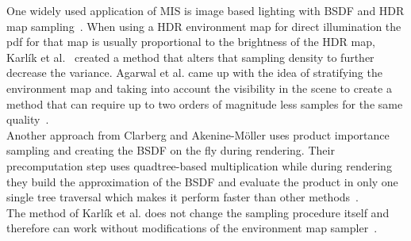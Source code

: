 One widely used application of MIS is image based lighting with BSDF and HDR map sampling~\cite{pbr-book}.
When using a HDR environment map for direct illumination the pdf for that map is usually proportional to the brightness of the HDR map,
Karl\'ik et al.~\cite{Karlik2019} created a method that alters that sampling density to further decrease the variance.
Agarwal et al. came up with the idea of stratifying the environment map
and taking into account the visibility in the scene
to create a method that can require up to two orders of magnitude less samples for the same quality~\cite{agarwal}.\\
Another approach from Clarberg and Akenine-Möller uses product importance sampling
and creating the BSDF on the fly during rendering.
Their precomputation step uses quadtree-based multiplication while during rendering they build the approximation of the BSDF
and evaluate the product in only one single tree traversal which makes it perform faster than other methods~\cite{clarberg}.\\
The method of Karl\'ik et al. does not change the sampling procedure itself and therefore can work without modifications of the environment map sampler~\cite{Karlik2019}.




